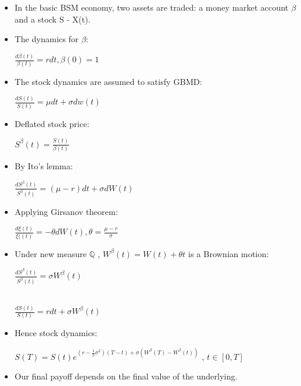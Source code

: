 \documentclass{article}
\begin{document}
 \begin{itemize}

     \item In the basic BSM economy, two assets are traded: a money market account $\beta$  and  a stock S - X(t).

     \item The dynamics for $\beta$:
\begin{center}   
 $\frac{d \beta(t)}{\beta(t)}=r d t, \beta(0)=1$
 \end{center}
     \item The stock dynamics are assumed to satisfy GBMD:
\begin{center}   
$\frac{d S(t)}{S(t)}=\mu d t+\sigma d w(t)$
 \end{center}
 
    \item Deflated stock price:
\begin{center}   
$S^\beta(t)=\frac{S(t)}{\beta(t)}$
 \end{center}
     \item By Ito's lemma:
\begin{center}   
$\frac{d S^\beta(t)}{S^\beta(t)}=(\mu-r) d t+\sigma d W(t)$
\end{center}

     \item Applying Girsanov theorem:
\begin{center}   
$\frac{d \xi(t)}{\xi((t)}=-\theta d W(t), \theta=\frac{\mu-r}{\sigma}$
\end{center}

     \item Under new measure ${\mathbb{Q}}$ ,  $W^\beta(t)=W(t)+\theta t$
    is a Brownian motion: 
     
\begin{center}   
$\frac{d S^\beta(t)}{S^\beta(t)}=\sigma W^\beta(t)$

\\[0.3cm] $\frac{d S(t)}{S(t)}=r d t+\sigma W^\beta(t)$
\end{center}

     \item Hence stock dynamics:
\begin{center}   
$S(T)=S(t) e^{\left(r-\frac{1}{2} \sigma^2\right)(T-t)+\sigma\left(W^\beta(T)-W^\beta(t)\right)}$ , 
$t \in[0, T]$
\end{center}


     \item Our final payoff depends on the final value of the underlying.


\end{itemize}
\end{document}
